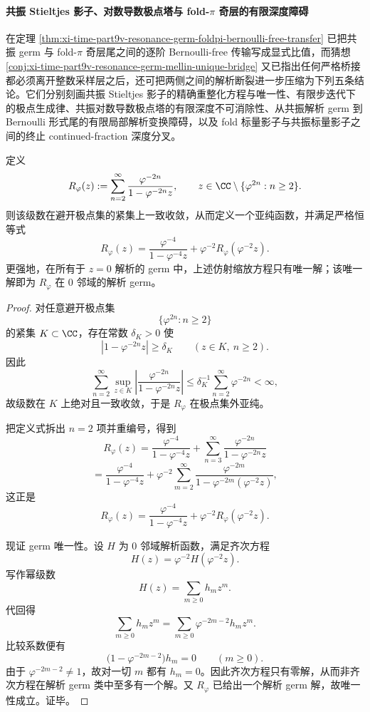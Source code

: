 \paragraph{共振 Stieltjes 影子、对数导数极点塔与 fold-\(\pi\) 奇层的有限深度障碍}
在定理 \ref{thm:xi-time-part9v-resonance-germ-foldpi-bernoulli-free-transfer} 已把共振 germ 与 fold-\(\pi\) 奇层尾之间的逐阶 Bernoulli-free 传输写成显式比值，而猜想 \ref{conj:xi-time-part9v-resonance-germ-mellin-unique-bridge} 又已指出任何严格桥接都必须离开整数采样层之后，还可把两侧之间的解析断裂进一步压缩为下列五条结论。它们分别刻画共振 Stieltjes 影子的精确重整化方程与唯一性、有限步迭代下的极点生成律、共振对数导数极点塔的有限深度不可消除性、从共振解析 germ 到 Bernoulli 形式尾的有限局部解析变换障碍，以及 fold 标量影子与共振标量影子之间的终止 continued-fraction 深度分叉。

\begin{theorem}\label{thm:xi-time-part9vk-resonance-stieltjes-shadow-renormalization-uniqueness}
定义
\[
R_\varphi(z):=
\sum_{n=2}^{\infty}\frac{\varphi^{-2n}}{1-\varphi^{-2n}z},
\qquad
z\in\CC\setminus\{\varphi^{2n}:n\ge 2\}.
\]
则该级数在避开极点集的紧集上一致收敛，从而定义一个亚纯函数，并满足严格恒等式
\[
R_\varphi(z)=\frac{\varphi^{-4}}{1-\varphi^{-4}z}
+\varphi^{-2}R_\varphi(\varphi^{-2}z).
\]
更强地，在所有于 \(z=0\) 解析的 germ 中，上述仿射缩放方程只有唯一解；该唯一解即为 \(R_\varphi\) 在 \(0\) 邻域的解析 germ。
\end{theorem}
\begin{proof}
对任意避开极点集
\[
\{\varphi^{2n}:n\ge 2\}
\]
的紧集 \(K\subset\CC\)，存在常数 \(\delta_K>0\) 使
\[
|1-\varphi^{-2n}z|\ge \delta_K
\qquad (z\in K,\ n\ge 2).
\]
因此
\[
\sum_{n=2}^{\infty}\sup_{z\in K}
\left|
\frac{\varphi^{-2n}}{1-\varphi^{-2n}z}
\right|
\le
\delta_K^{-1}\sum_{n=2}^{\infty}\varphi^{-2n}<\infty,
\]
故级数在 \(K\) 上绝对且一致收敛，于是 \(R_\varphi\) 在极点集外亚纯。

把定义式拆出 \(n=2\) 项并重编号，得到
\[
R_\varphi(z)
=
\frac{\varphi^{-4}}{1-\varphi^{-4}z}
+\sum_{n=3}^{\infty}\frac{\varphi^{-2n}}{1-\varphi^{-2n}z}
\]
\[
=
\frac{\varphi^{-4}}{1-\varphi^{-4}z}
+\varphi^{-2}\sum_{m=2}^{\infty}
\frac{\varphi^{-2m}}{1-\varphi^{-2m}(\varphi^{-2}z)},
\]
这正是
\[
R_\varphi(z)=\frac{\varphi^{-4}}{1-\varphi^{-4}z}
+\varphi^{-2}R_\varphi(\varphi^{-2}z).
\]

现证 germ 唯一性。设 \(H\) 为 \(0\) 邻域解析函数，满足齐次方程
\[
H(z)=\varphi^{-2}H(\varphi^{-2}z).
\]
写作幂级数
\[
H(z)=\sum_{m\ge 0}h_m z^m.
\]
代回得
\[
\sum_{m\ge 0}h_m z^m
=
\sum_{m\ge 0}\varphi^{-2m-2}h_m z^m.
\]
比较系数便有
\[
\bigl(1-\varphi^{-2m-2}\bigr)h_m=0
\qquad (m\ge 0).
\]
由于 \(\varphi^{-2m-2}\neq 1\)，故对一切 \(m\) 都有 \(h_m=0\)。因此齐次方程只有零解，从而非齐次方程在解析 germ 类中至多有一个解。又 \(R_\varphi\) 已给出一个解析 germ 解，故唯一性成立。证毕。
\end{proof}

